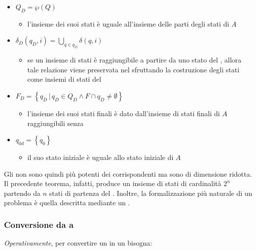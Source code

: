 \documentclass[italian, 10pt]{article}
\begin{document}
\begin{itemize}
  \item \(Q_D = \wp(Q)\)
        \begin{itemize}[label=\(\rightarrow\)]
          \item l'insieme dei suoi stati è uguale all'insieme delle parti degli stati di \(A\)
        \end{itemize}
  \item \(\displaystyle \delta_D(q_D, i) = \bigcup_{q \in q_D} \delta(q, i) \)
        \begin{itemize}[label=\(\rightarrow\)]
          \item se un insieme di stati è raggiungibile a partire da uno stato del \NFA, allora tale relazione viene preservata nel \DFA sfruttando la costruzione degli stati come insiemi di stati del \NFA
        \end{itemize}
  \item \(F_D = \left\{q_D \, | \, q_D \in Q_D \land F \cap q_D \neq \emptyset \right\}\)
        \begin{itemize}[label=\(\rightarrow\)]
          \item l'insieme dei suoi stati finali è dato dall'insieme di stati finali di \(A\) raggiungibili senza \ND
        \end{itemize}
  \item \(q_{0d} = \left\{q_0\right\}\)
        \begin{itemize}[label=\(\rightarrow\)]
          \item il suo stato iniziale è uguale allo stato iniziale di \(A\)
        \end{itemize}
\end{itemize}

Gli \NFA non sono quindi più potenti dei corrispondenti \DFA ma sono di dimensione ridotta.
Il precedente teorema, infatti, produce un insieme di stati di cardinalità \(2^n\) partendo da \(n\) stati di partenza del \NFA.
Inoltre, la formalizzazione più naturale di un problema è quella descritta mediante un \NFA.

\subsubsection{Conversione da \NFA a \DFA}

\textit{Operativamente}, per convertire un \FSA in un \DFA bisogna:
\end{document}
